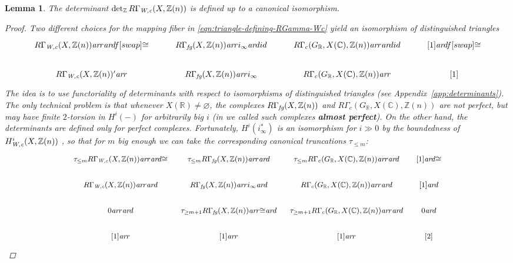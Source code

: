 \documentclass[10pt,a4paper,oneside]{article}
\newcommand{\CC}{\mathbb{C}}
\newcommand{\RR}{\mathbb{R}}
\newcommand{\ZZ}{\mathbb{Z}}
\renewcommand{\det}{\operatorname{det}}
\renewcommand{\emptyset}{\varnothing}
\newcommand{\ar}{\text{\it ar}}
\newcommand{\fg}{\text{\it fg}}
\newcommand{\Wc}{\text{\it W,c}}
\theoremstyle{myplain}
\newtheorem{lemma}[theorem]{Lemma}
\theoremstyle{mydefinition}
\numberwithin{equation}{section}
\begin{document}
\begin{lemma}
  \label{lemma:determinant-of-RGamma-Wc-well-defined}
  The determinant $\det_\ZZ R\Gamma_\Wc (X, \ZZ(n))$ is defined up to a
  canonical isomorphism.

  \begin{proof}
    Two different choices for the mapping fiber in
    \eqref{eqn:triangle-defining-RGamma-Wc} yield an isomorphism of
    distinguished triangles
    \[ \begin{tikzcd}
        R\Gamma_\Wc (X, \ZZ(n)) \ar{r}\ar{d}{f}[swap]{\cong} & R\Gamma_\fg (X,\ZZ(n)) \ar{r}{i_\infty}\ar{d}{id} & R\Gamma_c (G_\RR, X (\CC), \ZZ (n)) \ar{r}\ar{d}{id} & {[1]}\ar{d}{f}[swap]{\cong} \\
        R\Gamma_\Wc (X, \ZZ(n))' \ar{r} & R\Gamma_\fg (X,\ZZ(n)) \ar{r}{i_\infty} & R\Gamma_c (G_\RR, X (\CC), \ZZ (n)) \ar{r} & {[1]}
      \end{tikzcd} \]
    The idea is to use functoriality of determinants with respect to
    isomorphisms of distinguished triangles
    (see Appendix~\ref{app:determinants}). The only technical problem is that
    whenever $X (\RR) \ne \emptyset$, the complexes $R\Gamma_\fg (X,\ZZ(n))$ and
    $R\Gamma_c (G_\RR, X (\CC), \ZZ (n))$ are not perfect, but may have finite
    $2$-torsion in $H^i (-)$ for arbitrarily big $i$ (in
    \cite{Beshenov-Weil-etale-1} we called such complexes \textbf{almost
      perfect}). On the other hand, the determinants are defined only for
    perfect complexes. Fortunately, $H^i (i_\infty^*)$ is an isomorphism for
    $i \gg 0$ by the boundedness of $H^i_\Wc (X, \ZZ(n))$
    \cite[Proposition~7.12]{Beshenov-Weil-etale-1}, so that for $m$ big enough
    we can take the corresponding canonical truncations $\tau_{\le m}$:
    \[ \begin{tikzcd}[row sep=1.5em, column sep=0.75em, font=\small]
        \tau_{\le m} R\Gamma_\Wc (X, \ZZ(n)) \ar{r}\ar{d}{\cong} & \tau_{\le m} R\Gamma_\fg (X,\ZZ(n)) \ar{r}\ar{d} & \tau_{\le m} R\Gamma_c (G_\RR, X (\CC), \ZZ (n)) \ar{r}\ar{d} & {[1]}\ar{d}{\cong} \\
        R\Gamma_\Wc (X, \ZZ(n)) \ar{r}\ar{d} & R\Gamma_\fg (X,\ZZ(n)) \ar{r}{i_\infty}\ar{d} & R\Gamma_c (G_\RR, X (\CC), \ZZ (n)) \ar{r}\ar{d} & {[1]}\ar{d} \\
        0 \ar{r}\ar{d} & \tau_{\ge m+1} R\Gamma_\fg (X,\ZZ(n)) \ar{r}{\cong}\ar{d} & \tau_{\ge m+1} R\Gamma_c (G_\RR, X (\CC), \ZZ (n)) \ar{r}\ar{d} & 0\ar{d} \\
        {[1]} \ar{r} & {[1]} \ar{r} & {[1]} \ar{r} & {[2]}
      \end{tikzcd} \]


\end{proof}
\end{lemma}
\end{document}

